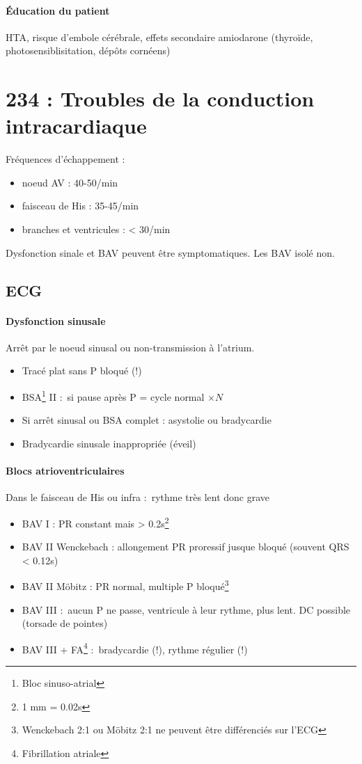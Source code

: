 \paragraph{Éducation du patient}
HTA, risque d'embole cérébrale, effets secondaire amiodarone (thyroïde,
photosensiblisitation, dépôts cornéens)






\section{234 : Troubles de la conduction intracardiaque}%
\label{sec:234_troubles_de_la_conduction_intracardiaque}
Fréquences d'échappement :
\begin{itemize}
  \item noeud AV : 40-50/min
  \item faisceau de His : 35-45/min
  \item branches et ventricules : < 30/min
\end{itemize}
Dysfonction sinale et BAV peuvent être symptomatiques. Les BAV isolé non.

\subsection{ECG}%
\paragraph{Dysfonction sinusale}
Arrêt par le noeud sinusal ou non-transmission à l'atrium.

\begin{itemize}
  \item Tracé plat sans P bloqué (!)
  \item BSA\footnote{Bloc sinuso-atrial} II : si pause après P = cycle normal $\times N$
  \item Si arrêt sinusal ou BSA complet : asystolie ou bradycardie
  \item Bradycardie sinusale inappropriée (éveil)
\end{itemize}

\paragraph{Blocs atrioventriculaires}
Dans le faisceau de His ou infra : rythme très lent donc grave \skull
\begin{itemize}
  \item BAV I : PR constant mais > 0.2s\footnote{1 mm = 0.02s}
  \item BAV II Wenckebach : allongement PR proressif jusque bloqué (souvent QRS
    < 0.12s)
  \item BAV II Möbitz : PR normal, multiple P bloqué\footnote{Wenckebach 2:1 ou
    Möbitz 2:1 ne peuvent être différenciés sur l'ECG}
  \item BAV III : aucun P ne passe, ventricule à leur rythme, plus lent.
    \danger{} DC possible (torsade de pointes)
  \item BAV III + FA\footnote{Fibrillation atriale} : bradycardie (!), rythme
    régulier (!)
\end{itemize}

